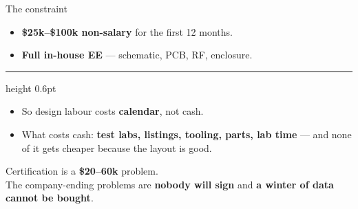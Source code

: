 \documentclass[aspectratio=169,t,10pt,xcolor={table,svgnames}]{beamer}
\begin{document}
\begin{frame}{The constraint}
  \begin{itemize}
    \item \textbf{\$25k--\$100k non-salary} for the first 12 months.
    \item \textbf{Full in-house EE} --- schematic, PCB, RF, enclosure.
  \end{itemize}
  \vspace{0.5em}
  {\color{hair}\hrule height 0.6pt}
  \vspace{0.5em}
  \begin{itemize}
    \item So design labour costs \textbf{calendar}, not cash.
    \item What costs cash: \textbf{test labs, listings, tooling, parts, lab time} --- and none of it
          gets cheaper because the layout is good.
  \end{itemize}
  \vspace{0.8em}
  \begin{beamercolorbox}[wd=\textwidth,sep=1.6ex]{}
    \color{ink}\small Certification is a \textbf{\$20--60k} problem.\\
    The company-ending problems are \textbf{nobody will sign} and \textbf{a winter of data cannot be bought}.
  \end{beamercolorbox}
\end{frame}
\end{document}
